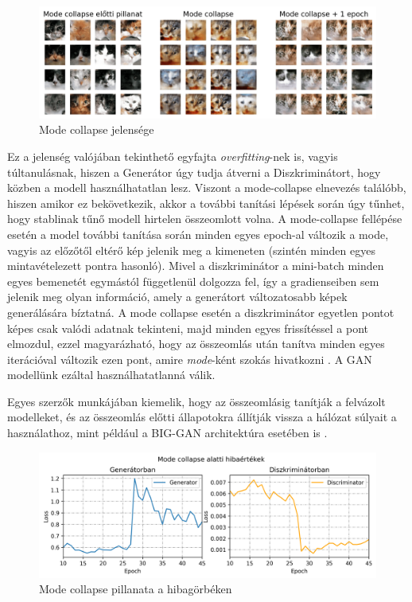 \begin{figure}[h]
	\centering
	\includegraphics[width=15cm]{images/mode-collapse.png}
	\caption{Mode collapse jelensége}
	\label{fig:mode-collapse}
\end{figure}

Ez a jelenség valójában tekinthető egyfajta \textit{overfitting}-nek is, vagyis túltanulásnak, hiszen a Generátor úgy tudja átverni a Diszkriminátort, hogy közben a modell használhatatlan lesz. Viszont a mode-collapse elnevezés találóbb, hiszen amikor ez bekövetkezik, akkor a további tanítási lépések során úgy tűnhet, hogy stablinak tűnő modell hirtelen összeomlott volna.
A mode-collapse fellépése esetén a model további tanítása során minden egyes epoch-al változik a mode, vagyis az előzőtől eltérő kép jelenik meg a kimeneten (szintén minden egyes mintavételezett pontra hasonló). Mivel a diszkriminátor a mini-batch minden egyes bemenetét egymástól függetlenül dolgozza fel, így a gradienseiben sem jelenik meg olyan információ, amely a generátort változatosabb képek generálására bíztatná. A mode collapse esetén a diszkriminátor egyetlen pontot képes csak valódi adatnak tekinteni, majd minden egyes frissítéssel a pont elmozdul, ezzel magyarázható, hogy az összeomlás után tanítva minden egyes iterációval változik ezen pont, amire \textit{mode}-ként szokás hivatkozni \cite{salimans2016improved}. A GAN modellünk ezáltal használhatatlanná válik.

Egyes szerzők munkájában kiemelik, hogy az összeomlásig tanítják a felvázolt modelleket, és az összeomlás előtti állapotokra állítják vissza a hálózat súlyait a használathoz, mint például a BIG-GAN architektúra esetében is \cite{brock2018large}.

\begin{figure}[h]
	\centering
	\includegraphics[width=15cm]{images/mode_collapse_loss.png}
	\caption{Mode collapse pillanata a hibagörbéken}
	\label{fig:mode_collapse_loss}
\end{figure}

